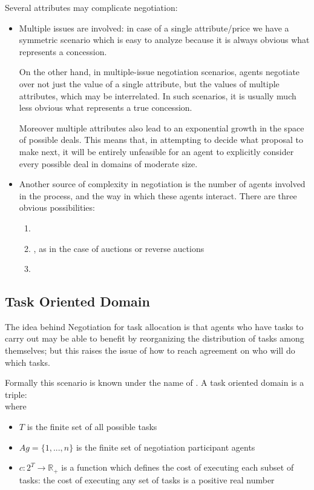 Several attributes may complicate negotiation:
\begin{itemize}
\item Multiple issues are involved: in case of a single attribute/price we have a symmetric scenario which is easy to analyze because it is always obvious what represents a concession.

On the other hand, in multiple-issue negotiation scenarios, agents negotiate over not just the value of a single attribute, but the values of multiple attributes, which may be interrelated. In such scenarios, it is usually much less obvious what represents a true concession.

Moreover multiple attributes also lead to an exponential growth in the space of possible deals. This means that, in attempting to decide what proposal to make next, it will be entirely unfeasible for an agent to explicitly consider every possible deal in domains of moderate size.
\item Another source of complexity in negotiation is the number of agents involved in the process, and the way in which these agents interact. There are three obvious possibilities:
\begin{enumerate}
\item {}
\item {}, as in the case of auctions or reverse auctions
\item {}
\end{enumerate}
\end{itemize}

\subsection{Task Oriented Domain}
The idea behind Negotiation for task allocation is that agents who have tasks to carry out may be able to benefit by reorganizing the distribution of tasks among themselves; but this raises the issue of how to reach agreement on who will do which tasks.

Formally this scenario is known under the name of . A task oriented domain is a triple:
\[< T, Ag, c >\]
where
\begin{itemize}
\item $T$ is the finite set of all possible tasks
\item $Ag = \{1,...,n\}$ is the finite set of negotiation participant agents
\item $c: 2^T \rightarrow\mathbb{R}_+$ is a function which defines the cost of executing each subset of tasks: the cost of executing any set of tasks is a positive real number 
\end{itemize}

